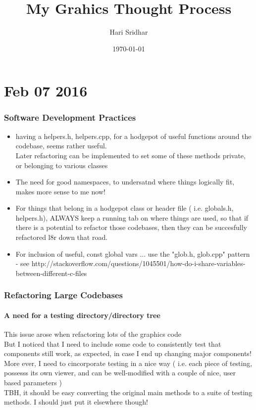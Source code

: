 \documentclass{article}
\begin{document}
\title*{My Grahics Thought Process}
\author{Hari Sridhar}
\date{\today}
\newpage

\part{Feb 07 2016}
\section{Software Development Practices}
\begin{itemize}
	\item having a helpers.h, helpers.cpp, for a hodgepot of useful functions around the codebase, seems rather useful. 
	\\ Later refactoring can be implemented to set some of these methods private, or belonging to various classes
	\item The need for good namespaces, to undersatnd where things logically fit, makes more sense to me now!
	\item For things that belong in a hodgepot class or header file ( i.e. globals.h, helpers.h), ALWAYS keep a running tab on where things are used, so that if there is a potential to refactor those codebases, then they can be succesfully refactored l8r down that road.
	\item For inclusion of useful, const global vars ... use the "glob.h, glob.cpp" pattern - see http://stackoverflow.com/questions/1045501/how-do-i-share-variables-between-different-c-files
\end{itemize}

\section{Refactoring Large Codebases}
\subsection{A need for a testing directory/directory tree}
This issue arose when refactoring lots of the graphics code
\\ But I noticed that I need to include some code to consistently test that components still work, as expected, in case I end up changing major components!
\\ More ever, I need to cincorporate testing in a nice way ( i.e. each piece of testing, possesss its own viewer, and can be well-modified with a couple of nice, user based parameters )
\\ TBH, it should be easy converting the original main methods to a suite of testing methods. I should just put it elsewhere though! 
\newpage
\end{document}
